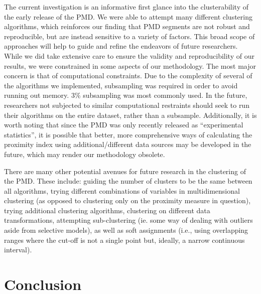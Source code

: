 \documentclass[11pt, a4paper]{article}
\begin{document}
The current investigation is an informative first glance into the clusterability of the early release of the PMD. We were able to attempt many different clustering algorithms, which reinforces our finding that PMD segments are not robust and reproducible, but are instead sensitive to a variety of factors. This broad scope of approaches will help to guide and refine the endeavors of future researchers. While we did take extensive care to ensure the validity and reproducibility of our results, we were constrained in some aspects of our methodology. The most major concern is that of computational constraints. Due to the complexity of several of the algorithms we implemented, subsampling was required in order to avoid running out memory. 3\% subsampling was most commonly used. In the future, researchers not subjected to similar computational restraints should seek to run their algorithms on the entire dataset, rather than a subsample. Additionally, it is worth noting that since the PMD was only recently released as ``experimental statistics'', it is possible that better,  more comprehensive ways of calculating the proximity index using additional/different data sources may be developed in the future, which may render our methodology obsolete.
\par
There are many other potential avenues for future research in the clustering of the PMD. These include: guiding the number of clusters to be the same between all algorithms, trying different combinations of variables in multidimensional clustering (as opposed to clustering only on the proximity measure in question), trying additional clustering algorithms, clustering on different data transformations, attempting sub-clustering (ie. some way of dealing with outliers aside from selective models), as well as soft assignments (i.e., using overlapping ranges where the cut-off is not a single point but, ideally, a narrow continuous interval).








\pagebreak
\section{Conclusion}
\end{document}

